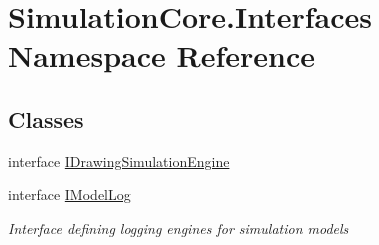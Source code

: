 \hypertarget{namespace_simulation_core_1_1_interfaces}{}\section{Simulation\+Core.\+Interfaces Namespace Reference}
\label{namespace_simulation_core_1_1_interfaces}
\subsection*{Classes}
\begin{DoxyCompactItemize}
\item 
interface \hyperlink{interface_simulation_core_1_1_interfaces_1_1_i_drawing_simulation_engine}{I\+Drawing\+Simulation\+Engine}
\item 
interface \hyperlink{interface_simulation_core_1_1_interfaces_1_1_i_model_log}{I\+Model\+Log}
\begin{DoxyCompactList}\small\item\em Interface defining logging engines for simulation models \end{DoxyCompactList}\end{DoxyCompactItemize}
